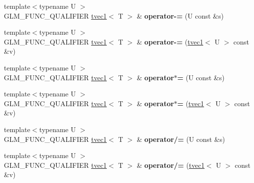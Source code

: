 \begin{DoxyCompactItemize}
\item 
\hypertarget{structglm_1_1detail_1_1tvec1_a771f4c0d41cd631d441860fffb0cccd6}{{\footnotesize template$<$typename U $>$ }\\G\-L\-M\-\_\-\-F\-U\-N\-C\-\_\-\-Q\-U\-A\-L\-I\-F\-I\-E\-R \hyperlink{structglm_1_1detail_1_1tvec1}{tvec1}$<$ T $>$ \& {\bfseries operator-\/=} (U const \&s)}\label{structglm_1_1detail_1_1tvec1_a771f4c0d41cd631d441860fffb0cccd6}

\item 
\hypertarget{structglm_1_1detail_1_1tvec1_ae383c53bd24ad1d9a749c83353b9ec9a}{{\footnotesize template$<$typename U $>$ }\\G\-L\-M\-\_\-\-F\-U\-N\-C\-\_\-\-Q\-U\-A\-L\-I\-F\-I\-E\-R \hyperlink{structglm_1_1detail_1_1tvec1}{tvec1}$<$ T $>$ \& {\bfseries operator-\/=} (\hyperlink{structglm_1_1detail_1_1tvec1}{tvec1}$<$ U $>$ const \&v)}\label{structglm_1_1detail_1_1tvec1_ae383c53bd24ad1d9a749c83353b9ec9a}

\item 
\hypertarget{structglm_1_1detail_1_1tvec1_a46e23ec90043f1ccab970fd5675c782c}{{\footnotesize template$<$typename U $>$ }\\G\-L\-M\-\_\-\-F\-U\-N\-C\-\_\-\-Q\-U\-A\-L\-I\-F\-I\-E\-R \hyperlink{structglm_1_1detail_1_1tvec1}{tvec1}$<$ T $>$ \& {\bfseries operator$\ast$=} (U const \&s)}\label{structglm_1_1detail_1_1tvec1_a46e23ec90043f1ccab970fd5675c782c}

\item 
\hypertarget{structglm_1_1detail_1_1tvec1_a0f02cfcc917aecd7f4320d644ffd15aa}{{\footnotesize template$<$typename U $>$ }\\G\-L\-M\-\_\-\-F\-U\-N\-C\-\_\-\-Q\-U\-A\-L\-I\-F\-I\-E\-R \hyperlink{structglm_1_1detail_1_1tvec1}{tvec1}$<$ T $>$ \& {\bfseries operator$\ast$=} (\hyperlink{structglm_1_1detail_1_1tvec1}{tvec1}$<$ U $>$ const \&v)}\label{structglm_1_1detail_1_1tvec1_a0f02cfcc917aecd7f4320d644ffd15aa}

\item 
\hypertarget{structglm_1_1detail_1_1tvec1_a2b2c4d88644c420e9be670a520e3c92a}{{\footnotesize template$<$typename U $>$ }\\G\-L\-M\-\_\-\-F\-U\-N\-C\-\_\-\-Q\-U\-A\-L\-I\-F\-I\-E\-R \hyperlink{structglm_1_1detail_1_1tvec1}{tvec1}$<$ T $>$ \& {\bfseries operator/=} (U const \&s)}\label{structglm_1_1detail_1_1tvec1_a2b2c4d88644c420e9be670a520e3c92a}

\item 
\hypertarget{structglm_1_1detail_1_1tvec1_a226743ae3ce8afb646fd681ef0ba061b}{{\footnotesize template$<$typename U $>$ }\\G\-L\-M\-\_\-\-F\-U\-N\-C\-\_\-\-Q\-U\-A\-L\-I\-F\-I\-E\-R \hyperlink{structglm_1_1detail_1_1tvec1}{tvec1}$<$ T $>$ \& {\bfseries operator/=} (\hyperlink{structglm_1_1detail_1_1tvec1}{tvec1}$<$ U $>$ const \&v)}\label{structglm_1_1detail_1_1tvec1_a226743ae3ce8afb646fd681ef0ba061b}


\end{DoxyCompactItemize}
